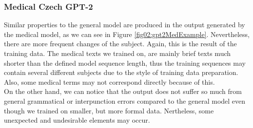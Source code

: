 \subsubsection*{Medical Czech GPT-2}
Similar properties to the general model are produced in the output generated by the medical model, as we can see in Figure \ref{fig02:gpt2MedExample}. Nevertheless, there are more frequent changes of the subject. Again, this is the result of the training data. The medical texts we trained on, are mainly brief texts much shorter than the defined model sequence length, thus the training sequences may contain several different subjects due to the style of training data preparation. Also, some medical terms may not correspond directly because of this. \\

On the other hand, we can notice that the output does not suffer so much from general grammatical or interpunction errors compared to the general model even though we trained on smaller, but more formal data. Nertheless, some unexpected and undesirable elements may occur.\\

